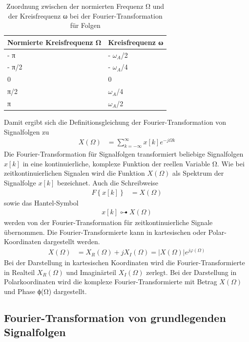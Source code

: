 \begin{table}
  \centering
  \caption{Zuordnung zwischen der normierten Frequenz Ω und der Kreisfrequenz ω bei der Fourier-Transformation für Folgen}
  \label{tab:7.1}
  \begin{tabular}{ll}
    \toprule
    Normierte Kreisfrequenz Ω & Kreisfrequenz ω \\
    \midrule
    - π & - \(ω_{A}\)/2 \\
    - π/2 & - \(ω_{A}\)/4 \\
    0 & 0 \\
    π/2 & \(ω_{A}\)/4 \\
    π & \(ω_{A}\)/2 \\
    \bottomrule
  \end{tabular}
\end{table}

Damit ergibt sich die Definitionsgleichung der Fourier-Transformation von Signalfolgen zu
\begin{align}
X(\Omega) &= \sum\limits_{k = - \infty}^{\infty}{x[ k]  e^{- j  \Omega  k}} \label{eq:7.13}
\end{align}
Die Fourier-Transformation für Signalfolgen transformiert beliebige Signalfolgen \(x[k]\) in eine kontinuierliche, komplexe Funktion der reellen Variable Ω. Wie bei zeitkontinuierlichen Signalen wird die Funktion \(X(Ω)\) als Spektrum der Signalfolge \(x[k]\) bezeichnet. Auch die Schreibweise
\begin{align}
F\left\{ x[ k] \right\} &= X(\Omega) \label{eq:7.14}
\end{align}
sowie das Hantel-Symbol
\begin{align}
x[ k] \origof X(\Omega) \label{eq:7.15}
\end{align}
werden von der Fourier-Transformation für zeitkontinuierliche Signale übernommen. Die Fourier-Transformierte kann in kartesischen oder Polar-Koordinaten dargestellt werden.
\begin{align}
X(\Omega) &= X_{R}(\Omega) + j  X_{I}(\Omega) = \left| X(\Omega) \right|  e^{j  \varphi(\Omega)} \label{eq:7.16}
\end{align}
Bei der Darstellung in kartesischen Koordinaten wird die Fourier-Transformierte in Realteil \(X_{R}(Ω)\) und Imaginärteil \(X_{I}(Ω)\) zerlegt. Bei der Darstellung in Polarkoordinaten wird die komplexe Fourier-Transformierte mit Betrag \textbar \(X(Ω)\)\textbar{} und Phase ϕ(Ω) dargestellt.

\subsection{\texorpdfstring{Fourier-Transformation von grundlegenden Signalfolgen }{Fourier-Transformation von grundlegenden Signalfolgen }}\label{fourier-transformation-von-grundlegenden-signalfolgen}

